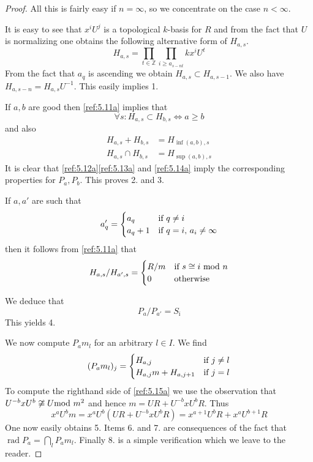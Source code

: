 \documentclass{amsproc}
\def \ZZ{{\mathbb Z}}
\def\rad{\operatorname {rad}}
\let\oldtext\text
\def\text#1{\oldtext{\upshape #1}}
\theoremstyle{definition}
\theoremstyle{remark}
\numberwithin{equation}{section}
\numberwithin{table}{section}
\numberwithin{figure}{section}
\begin{document}
\begin{proof}
All this is fairly easy if $n=\infty$, so we concentrate on the case
$n<\infty$. 








It is easy to see that $x^i U^j$ is a topological $k$-basis
for $R$
and from the fact that $U$ is normalizing one
obtains the following alternative form of $H_{a,s}$.
\begin{equation}
\label{ref:5.11a}
H_{a,s}=\prod_{t\in\ZZ}\prod_{i\ge a_{s-nt}} k x^i U^t
\end{equation}
From the fact that $a_q$ is ascending we obtain $H_{a,s}\subset
H_{a,s-1}$. We also have $H_{a,s-n}=H_{a,s}U^{-1}$. This easily
implies 1.

If $a,b$ are good then 
\eqref{ref:5.11a} implies that
\begin{equation}
\label{ref:5.12a}
\forall s:H_{a,s}\subset H_{b,s}\iff a\ge b
\end{equation}
and also
\begin{align}
\label{ref:5.13a}
H_{a,s}+H_{b,s}&=H_{\inf(a,b),s}\\
\label{ref:5.14a}
H_{a,s}\cap H_{b,s}&=H_{\sup(a,b),s}
\end{align}
It is clear that \eqref{ref:5.12a}\eqref{ref:5.13a} and \eqref{ref:5.14a}
imply the corresponding properties for $P_a, P_b$. This proves 2. and 3.

If $a,a'$ are such that
\[
a'_q=\begin{cases} a_q &\text{if $q\neq i$}\\
a_q+1&\text{if $q=i$, $a_i\ne \infty$}
\end{cases}
\]
then it follows from \eqref{ref:5.11a} that
\[
H_{a,s}/H_{a',s}=
\begin{cases} R/m&\text{if $s\cong i$ mod $n$}
\\
0&\text{otherwise}
\end{cases}
\]

 We deduce that 
\[
P_{a}/P_{a'}=S_{\bar\imath }
\]
This yields 4.


We now compute $P_{a}m_l$ for an arbitrary $l\in I$. We find
\begin{equation}
\label{ref:5.15a}
(P_{a}m_l)_j=
\begin{cases}
H_{a,j}&\text{if $j\neq l$}\\
H_{a,j}m+H_{a,j+1}&\text{if $j=l$}
\end{cases}
\end{equation}
To compute the righthand side of \eqref{ref:5.15a} we use the
observation that $U^{-b}xU^b\not\cong U\text{ mod } m^2$ and hence
$m=UR+U^{-b}xU^b R$. Thus
\[
x^aU^bm=x^aU^b(UR+U^{-b}xU^bR)=x^{a+1}U^bR+x^aU^{b+1}R
\]
One now easily obtains 5. Items 6. and 7. are consequences of the fact
that $\rad P_a=\bigcap_l P_a m_l$. Finally 8. is a simple verification
which we leave to the reader.
\end{proof}
\end{document}
